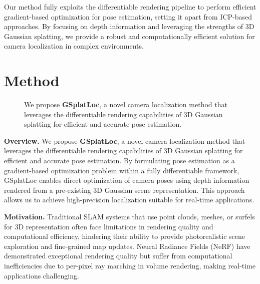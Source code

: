 \documentclass[twocolumn]{article}
\begin{document}
Our method fully exploits the differentiable rendering pipeline to
perform efficient gradient-based optimization for pose estimation,
setting it apart from ICP-based approaches. By focusing on depth
information and leveraging the strengths of 3D Gaussian splatting, we
provide a robust and computationally efficient solution for camera
localization in complex environments.

\section{Method}\label{method}

\begin{figure}[!t]
\vspace{-2cm}
\centering
{}
\caption{We propose \textbf{GSplatLoc}, a novel camera localization method that leverages the differentiable rendering capabilities of 3D Gaussian splatting for efficient and accurate pose estimation.}
\label{fig:cross-column-image}
\end{figure}

\textbf{Overview.} We propose \textbf{GSplatLoc}, a novel camera
localization method that leverages the differentiable rendering
capabilities of 3D Gaussian splatting for efficient and accurate pose
estimation. By formulating pose estimation as a gradient-based
optimization problem within a fully differentiable framework, GSplatLoc
enables direct optimization of camera poses using depth information
rendered from a pre-existing 3D Gaussian scene representation. This
approach allows us to achieve high-precision localization suitable for
real-time applications.

\textbf{Motivation.} Traditional SLAM systems that use point clouds,
meshes, or surfels for 3D representation often face limitations in
rendering quality and computational efficiency, hindering their ability
to provide photorealistic scene exploration and fine-grained map
updates. Neural Radiance Fields (NeRF)
\autocite{mildenhallNeRFRepresentingScenes2022} have demonstrated
exceptional rendering quality but suffer from computational
inefficiencies due to per-pixel ray marching in volume rendering, making
real-time applications challenging.
\end{document}
